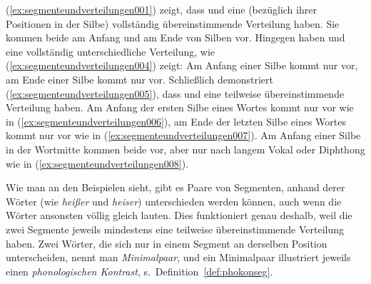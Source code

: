 \begin{exe}
  \ex\label{ex:segmenteundverteilungen001}
    \begin{xlist}
    \end{xlist}
  \ex\label{ex:segmenteundverteilungen005}
    \begin{xlist}
    \end{xlist}
\end{exe}

(\ref{ex:segmenteundverteilungen001}) zeigt, dass \textipa{[t]} und \textipa{[k]} eine (bezüglich ihrer Positionen in der Silbe) vollständig übereinstimmende Verteilung haben.
Sie kommen beide am Anfang und am Ende von Silben vor.
Hingegen haben \textipa{[h]} und \textipa{[N]} eine vollständig unterschiedliche  Verteilung, wie (\ref{ex:segmenteundverteilungen004}) zeigt:
Am Anfang einer Silbe kommt nur \textipa{[h]} vor, am Ende einer Silbe kommt nur \textipa{[N]} vor.
Schließlich demonstriert (\ref{ex:segmenteundverteilungen005}), dass \textipa{[s]} und \textipa{[z]} eine teilweise übereinstimmende Verteilung haben.
Am Anfang der ersten Silbe eines Wortes kommt nur \textipa{[z]} vor wie in (\ref{ex:segmenteundverteilungen006}), am Ende der letzten Silbe eines Wortes kommt nur \textipa{[s]} vor wie in (\ref{ex:segmenteundverteilungen007}).
Am Anfang einer Silbe in der Wortmitte kommen beide vor, \textipa{[z]} aber nur nach langem Vokal oder Diphthong wie in (\ref{ex:segmenteundverteilungen008}).

Wie man an den Beispielen sieht, gibt es Paare von Segmenten, anhand derer Wörter (wie \textit{heißer} und \textit{heiser}) unterschieden werden können, auch wenn die Wörter ansonsten völlig gleich lauten.
Dies funktioniert genau deshalb, weil die zwei Segmente jeweils mindestens eine teilweise übereinstimmende Verteilung haben.
Zwei Wörter, die sich nur in einem Segment an derselben Position unterscheiden, nennt man \textit{Minimalpaar}, und ein Minimalpaar illustriert jeweils einen \textit{phonologischen Kontrast}, s.\ Definition~\ref{def:phokonseg}.

